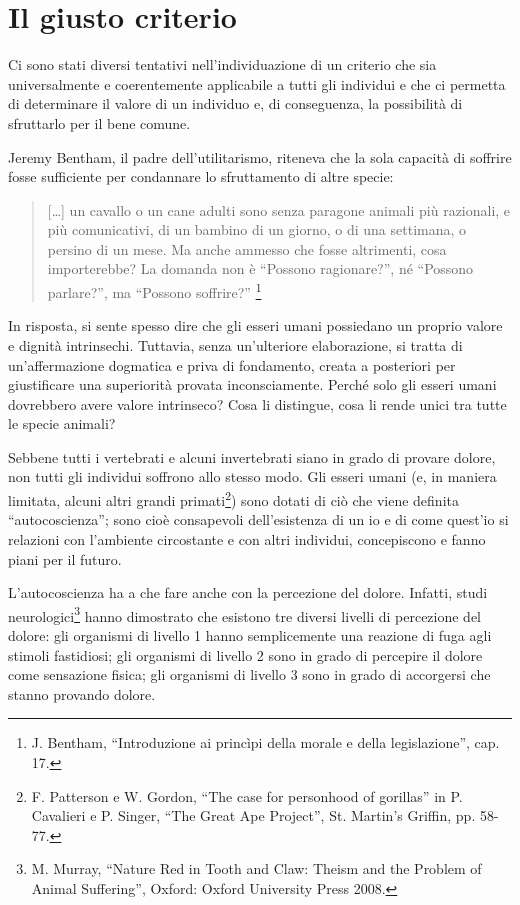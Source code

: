\documentclass[a4paper,11pt,oneside,article]{memoir}
\begin{document}
\chapter{Il giusto criterio}

Ci sono stati diversi tentativi nell'individuazione di un criterio che sia
universalmente e coerentemente applicabile a tutti gli individui e che ci
permetta di determinare il valore di un individuo e, di conseguenza, la
possibilità di sfruttarlo per il bene comune.

Jeremy Bentham, il padre dell'utilitarismo, riteneva che la sola capacità di
soffrire fosse sufficiente per condannare lo sfruttamento di altre specie:

\begin{quotation}

[…] un cavallo o un cane adulti sono senza paragone animali più razionali, e più
comunicativi, di un bambino di un giorno, o di una settimana, o persino di un
mese. Ma anche ammesso che fosse altrimenti, cosa importerebbe? La domanda non è
``Possono ragionare?'', né ``Possono parlare?'', ma ``Possono soffrire?''
\footnote{J. Bentham, ``Introduzione ai princìpi della morale e della
legislazione'', cap. 17.}

\end{quotation}

In risposta, si sente spesso dire che gli esseri umani possiedano un proprio
valore e dignità intrinsechi. Tuttavia, senza un'ulteriore elaborazione, si
tratta di un'affermazione dogmatica e priva di fondamento, creata a posteriori
per giustificare una superiorità provata inconsciamente. Perché solo gli esseri
umani dovrebbero avere valore intrinseco? Cosa li distingue, cosa li rende unici
tra tutte le specie animali?

Sebbene tutti i vertebrati e alcuni invertebrati siano in grado di provare
dolore, non tutti gli individui soffrono allo stesso modo. Gli esseri umani (e,
in maniera limitata, alcuni altri grandi primati\footnote{F. Patterson e W.
Gordon, ``The case for personhood of gorillas'' in P. Cavalieri e P. Singer,
``The Great Ape Project'', St. Martin's Griffin, pp. 58-77.}) sono dotati di ciò
che viene definita ``autocoscienza''; sono cioè consapevoli dell'esistenza di un
io e di come quest'io si relazioni con l'ambiente circostante e con altri
individui, concepiscono e fanno piani per il futuro.

L'autocoscienza ha a che fare anche con la percezione del dolore. Infatti, studi
neurologici\footnote{M. Murray, ``Nature Red in Tooth and Claw: Theism and the
Problem of Animal Suffering'', Oxford: Oxford University Press 2008.} hanno
dimostrato che esistono tre diversi livelli di percezione del dolore: gli
organismi di livello 1 hanno semplicemente una reazione di fuga agli stimoli
fastidiosi; gli organismi di livello 2 sono in grado di percepire il dolore come
sensazione fisica; gli organismi di livello 3 sono in grado di accorgersi che
stanno provando dolore.
\end{document}
